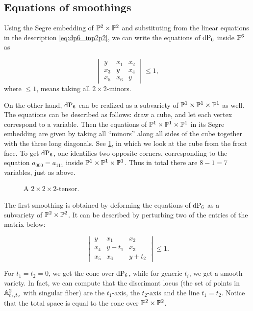\subsection{Equations of smoothings}

Using the Segre embedding of $\P^2 \times \P^2$ and substituting from the linear equations in the description \cref{eq:dp6_inp2p2}, we can write the equations of $\dP6$ inside $\P^6$ as

\begin{equation}
\begin{vmatrix}
y & x_1 & x_2 \\
x_3 & y & x_4 \\
x_5 & x_6 & y
\end{vmatrix} \leq 1,
\end{equation}
where $\leq 1$, means taking all $2 \times 2$-minors.

On the other hand, $\dP6$ can be realized as a subvariety of $\P^1 \times \P^1 \times \P^1$ as well. The equations can be described as follows: draw a cube, and let each vertex correspond to a variable. Then the equations of $\P^1 \times \P^1 \times \P^1$ in its Segre embedding are given by taking all ``minors'' along all sides of the cube together with the three long diagonals. See \cref{fig:p1p1p1_equations}, in which we look at the cube from the front face. To get $\dP6$, one identifies two opposite corners, corresponding to the equation $a_{000}=a_{111}$ inside $\P^1 \times \P^1 \times \P^1$. Thus in total there are $8-1=7$ variables, just as above. 

\begin{figure}[b]
\centering

\caption{A $2 \times 2 \times 2$-tensor.}
\label{fig:p1p1p1_equations}
\end{figure}

The first smoothing is obtained by deforming the equations of $\dP6$ as a subvariety of $\P^2 \times \P^2$.  It can be described by perturbing two of the entries of the matrix below:

\begin{equation}
\label{eq:def2}
\begin{vmatrix}
y & x_1 & x_2 \\
x_4 & y+t_1 & x_3 \\
x_5 & x_6 & y+t_2
\end{vmatrix} \leq 1.
\end{equation}


For $t_1=t_2=0$, we get the cone over $\dP6$, while for generic $t_i$, we get a smooth variety. In fact, we can compute that the discrimant locus (the set of points in $\A^2_{t_1,t_2}$ with singular fiber) are the $t_1$-axis, the $t_2$-axis and the line $t_1=t_2$. Notice that the total space is equal to the cone over $\P^2 \times \P^2$.

